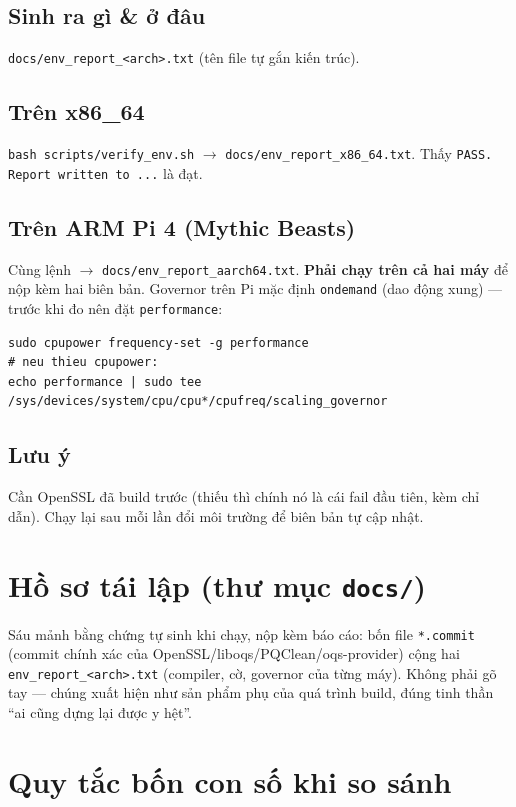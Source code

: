 \documentclass[11pt,a4paper]{article}
\begin{document}
\subsection*{Sinh ra gì \& ở đâu}
\verb|docs/env_report_<arch>.txt| (tên file tự gắn kiến trúc).

\subsection*{Trên x86\_64}
\verb|bash scripts/verify_env.sh| $\to$ \verb|docs/env_report_x86_64.txt|. Thấy \verb|PASS. Report written to ...| là đạt.

\subsection*{Trên ARM Pi 4 (Mythic Beasts)}
Cùng lệnh $\to$ \verb|docs/env_report_aarch64.txt|. \textbf{Phải chạy trên cả hai máy} để nộp kèm hai biên bản. Governor trên Pi mặc định \verb|ondemand| (dao động xung) — trước khi đo nên đặt \verb|performance|:
\begin{lstlisting}
sudo cpupower frequency-set -g performance
# neu thieu cpupower:
echo performance | sudo tee /sys/devices/system/cpu/cpu*/cpufreq/scaling_governor
\end{lstlisting}

\subsection*{Lưu ý}
Cần OpenSSL đã build trước (thiếu thì chính nó là cái fail đầu tiên, kèm chỉ dẫn). Chạy lại sau mỗi lần đổi môi trường để biên bản tự cập nhật.

\section{Hồ sơ tái lập (thư mục \texttt{docs/})}

Sáu mảnh bằng chứng tự sinh khi chạy, nộp kèm báo cáo: bốn file \verb|*.commit| (commit chính xác của OpenSSL/liboqs/PQClean/oqs-provider) cộng hai \verb|env_report_<arch>.txt| (compiler, cờ, governor của từng máy). Không phải gõ tay — chúng xuất hiện như sản phẩm phụ của quá trình build, đúng tinh thần ``ai cũng dựng lại được y hệt''.

\section{Quy tắc bốn con số khi so sánh}
\label{sec:fournum}
\end{document}
